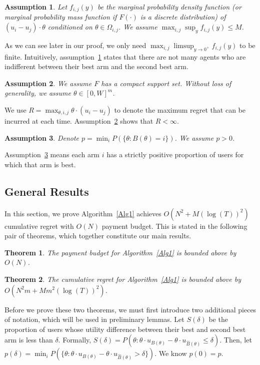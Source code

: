 \documentclass{article}
\newtheorem{theorem}{Theorem}
\newtheorem{assumption}{Assumption}
\begin{document}
\begin{assumption} Let $f_{i,j}(y)$ be the marginal probability density function (or marginal probability mass function if $F(\cdot)$ is a discrete distribution) of $(u_i-u_j)\cdot\theta$ conditioned on $\theta \in \Omega_{i,j}$. We assume $\max_{i,j}\sup_{y}f_{i,j}(y)\leq M$. 
\label{A1}
\end{assumption}

As we can see later in our proof, we only need $\max_{i,j}\limsup_{y\rightarrow 0^{+}}f_{i,j}(y)$ to be finite. Intuitively, assumption~\ref{A1} states that there are not many agents who are indifferent between their best arm and the second best arm. 

\begin{assumption} We assume $F$ has a compact support set. Without loss of generality, we assume $\theta\in [0,W]^m$.
\label{A2}
\end{assumption}

We use $R = \max_{\theta, i,j} \theta \cdot (u_i - u_j)$ to denote the maximum regret that can be incurred at each time.  Assumption~\ref{A2} shows that $R<\infty$.

\begin{assumption}
Denote $p=\min_{i}P(\{\theta: B(\theta)=i\})$. We assume $p>0$.
\label{A3}
\end{assumption}

Assumption~\ref{A3} means each arm $i$ has a strictly positive proportion of users for which that arm is best. 


\subsection{General Results}

In this section, we prove Algorithm~\ref{Alg1} achieves $O(N^2+M(\log(T))^2)$ cumulative regret with $O(N)$ payment budget.  This is stated in the following pair of theorems, which together constitute our main results.

\begin{theorem}
The payment budget for Algorithm~\ref{Alg1} is bounded above by $O(N)$. 
\label{rst:budget}
\end{theorem}


\begin{theorem}
The cumulative regret for Algorithm~\ref{Alg1} is bounded above by $O(N^2 m + M m^2(\log(T))^2)$.
\label{rst:regret}
\end{theorem}

Before we prove these two theorems, we must first introduce two additional pieces of notation, which will be used in preliminary lemmas.  Let $S(\delta)$ be the proportion of users whose utility difference between their best and second best arm is less than $\delta$. Formally, $S(\delta)=P(\theta: \theta \cdot u_{B(\theta)}-\theta\cdot u_{\hat{B}(\theta)}\leq \delta)$. Then, let $p(\delta)=\min_{i}P(\{\theta:\theta\cdot u_{B(\theta)}-\theta\cdot u_{\hat{B}(\theta)}>\delta\})$. We know $p(0)=p$. 
\end{document}

